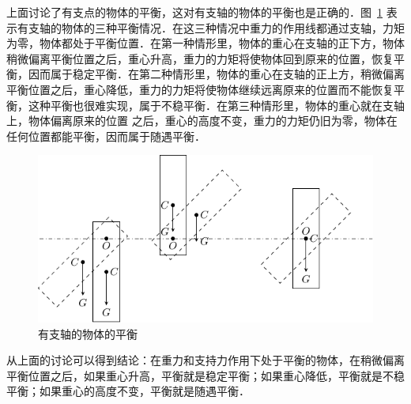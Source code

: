上面讨论了有支点的物体的平衡，这对有支轴的物体的平衡也是正确的．图~\ref{fig_A_6-17} 表示有支轴的物体的三种平衡情况．在这三种情况中重力的作用线都通过支轴，力矩为零，物体都处于平衡位置．在第一种情形里，物体的重心在支轴的正下方，物体稍微偏离平衡位置之后，重心升高，重力的力矩将使物体回到原来的位置，恢复平衡，因而属于稳定平衡．在第二种情形里，物体的重心在支轴的正上方，稍微偏离平衡位置之后，重心降低，重力的力矩将使物体继续远离原来的位置而不能恢复平衡，这种平衡也很难实现，属于不稳平衡．在第三种情形里，物体的重心就在支轴上，物体偏离原来的位置
之后，重心的高度不变，重力的力矩仍旧为零，物体在任何位置都能平衡，因而属于随遇平衡．
\begin{figure}[htbp]
    \centering
    \includegraphics{fig/A/6-17.pdf}
    \caption{有支轴的物体的平衡}\label{fig_A_6-17}
\end{figure}

从上面的讨论可以得到结论：在重力和支持力作用下处于平衡的物体，在稍微偏离平衡位置之后，如果重心升高，平衡就是稳定平衡；如果重心降低，平衡就是不稳平衡；如果重心的高度不变，平衡就是随遇平衡．


